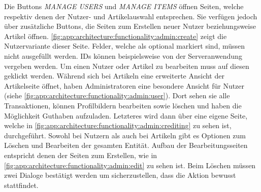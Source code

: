 \documentclass[a4paper, 11pt]{article}
\begin{document}
Die Buttons \textit{MANAGE USERS} und \textit{MANAGE ITEMS} öffnen Seiten, welche respektiv denen der Nutzer- und Artikelauswahl entsprechen.
Sie verfügen jedoch über zusätzliche Buttons, die Seiten zum Erstellen neuer Nutzer beziehungsweise Artikel öffnen.
\autoref{fig:app:architecture:functionality:admin:create} zeigt die Nutzervariante dieser Seite.
Felder, welche als optional markiert sind, müssen nicht ausgefüllt werden.
IDs können beispielsweise von der Serveranwendung vergeben werden.
Um einen Nutzer oder Artikel zu bearbeiten muss auf diesen geklickt werden.
Während sich bei Artikeln eine erweiterte Ansicht der Artikelseite öffnet, haben Administratoren eine besondere Ansicht für Nutzer (siehe \autoref{fig:app:architecture:functionality:admin:user}).
Dort sehen sie alle Transaktionen, können Profilbildern bearbeiten sowie löschen und haben die Möglichkeit Guthaben aufzuladen.
Letzteres wird dann über eine eigene Seite, welche in \autoref{fig:app:architecture:functionality:admin:crediting} zu sehen ist, durchgeführt.
Sowohl bei Nutzern als auch bei Artikeln gibt es Optionen zum Löschen und Bearbeiten der gesamten Entität.
Aufbau der Bearbeitungsseiten entspricht denen der Seiten zum Erstellen, wie in \autoref{fig:app:architecture:functionality:admin:edit} zu sehen ist.
Beim Löschen müssen zwei Dialoge bestätigt werden um sicherzustellen, dass die Aktion bewusst stattfindet.
\end{document}
